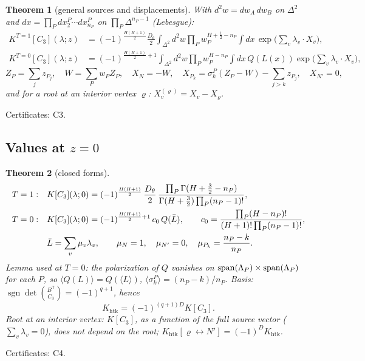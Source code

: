 \documentclass[10pt,a4paper]{article}
\numberwithin{equation}{section}
\newtheorem{theorem}{Theorem}[section]
\theoremstyle{definition}
\theoremstyle{remark}
\newcommand{\sgn}{\operatorname{sgn}}
\newcommand{\htk}{\mathrm{htk}}
\newcommand{\cert}[1]{\par\noindent\textup{Certificates: #1.}\par}
\begin{document}
\begin{theorem}[general sources and displacements]\label{thm-intrep}
With $d^2w=dw_A\,dw_B$ on $\Delta^2$ and $dx=\prod_Pdx^P_2\cdots dx^P_{n_P}$ on $\prod_P\Delta^{n_P-1}$ (Lebesgue):
\begin{align}
K^{T=1}[C_3](\lambda;z)&=(-1)^{\frac{H(H+1)}2}\frac{D_\theta}2\int_{\Delta^2}d^2w\prod_Pw_P^{H+\frac12-n_P}\int dx\,\exp\Big(\sum_v\lambda_v\cdot X_v\Big),\\
K^{T=0}[C_3](\lambda;z)&=(-1)^{\frac{H(H+1)}2+1}\int_{\Delta^2}d^2w\prod_Pw_P^{H-n_P}\int dx\,Q(L(x))\exp\Big(\sum_v\lambda_v\cdot X_v\Big),
\end{align}
\begin{equation}
Z_P=\sum_jz_{P_j},\quad W=\sum_Pw_PZ_P,\quad X_N=-W,\quad X_{P_k}=\sigma^P_k(Z_P-W)-\sum_{j>k}z_{P_j},\quad X_{N'}=0,
\end{equation}
and for a root at an interior vertex $\varrho$: $X^{(\varrho)}_v=X_v-X_\varrho$.
\end{theorem}
\cert{C3}

\subsection{\texorpdfstring{Values at $z=0$}{Values at z=0}}

\begin{theorem}[closed forms]\label{thm-closed}
\begin{align}
T=1:&\quad K[C_3](\lambda;0)=(-1)^{\frac{H(H+1)}2}\,\frac{D_\theta}2\,\frac{\prod_P\Gamma(H+\frac32-n_P)}{\Gamma(H+\frac32)\prod_P(n_P-1)!},\label{eq-T1}\\
T=0:&\quad K[C_3](\lambda;0)=(-1)^{\frac{H(H+1)}2+1}\,c_0\,Q(\bar L),\qquad c_0=\frac{\prod_P(H-n_P)!}{(H+1)!\prod_P(n_P-1)!},\label{eq-T0}\\
&\quad \bar L=\sum_v\mu_v\lambda_v,\qquad \mu_N=1,\quad\mu_{N'}=0,\quad \mu_{P_k}=\frac{n_P-k}{n_P}.\notag
\end{align}
Lemma used at $T=0$: the polarization of $Q$ vanishes on ${\rm span}(\Lambda_P)\times{\rm span}(\Lambda_P)$ for each $P$, so $\langle Q(L)\rangle=Q(\langle L\rangle)$, $\langle\sigma^P_k\rangle=(n_P-k)/n_P$. Basis: $\sgn\det\binom{B^{\mathsf T}}{C_3}=(-1)^{q+1}$, hence
\begin{equation}
K_\htk=(-1)^{(q+1)D}K[C_3].
\end{equation}
Root at an interior vertex: $K[C_3]$, as a function of the full source vector ($\sum_v\lambda_v=0$), does not depend on the root; $K_\htk[\varrho\leftrightarrow N']=(-1)^DK_\htk$.
\end{theorem}
\cert{C4}
\end{document}
